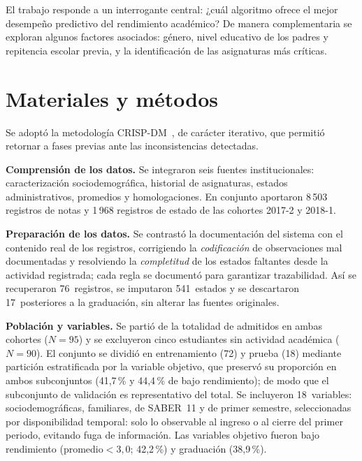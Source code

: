 \documentclass[runningheads]{llncs}
\begin{document}
El trabajo responde a un interrogante central: ¿cuál algoritmo ofrece
el mejor desempeño predictivo del rendimiento académico? De manera
complementaria se exploran algunos factores asociados: género, nivel
educativo de los padres y repitencia escolar previa, y la
identificación de las asignaturas más críticas.
 
\section{Materiales y métodos}
 
Se adoptó la metodología CRISP-DM~\cite{wirth2000}, de carácter
iterativo, que permitió retornar a fases previas ante las
inconsistencias detectadas.
 
\textbf{Comprensión de los datos.} Se integraron seis fuentes
institucionales: caracterización sociodemográfica, historial de
asignaturas, estados administrativos, promedios y homologaciones. En
conjunto aportaron 8\,503 registros de notas y 1\,968 registros de
estado de las cohortes 2017-2 y 2018-1.
 
\textbf{Preparación de los datos.} Se contrastó la documentación del
sistema con el contenido real de los registros, corrigiendo la
\emph{codificación} de observaciones mal documentadas y resolviendo la
\emph{completitud} de los estados faltantes desde la actividad
registrada; cada regla se documentó para garantizar trazabilidad. Así
se recuperaron 76~registros, se imputaron 541~estados y se descartaron
17~posteriores a la graduación, sin alterar las fuentes originales.
 
\textbf{Población y variables.} Se partió de la totalidad de admitidos en
ambas cohortes ($N=95$) y se excluyeron cinco estudiantes sin actividad
académica ($N=90$). El conjunto se dividió en entrenamiento (72) y
prueba (18) mediante partición estratificada por la variable objetivo,
que preservó su proporción en ambos subconjuntos (41,7\,\% y 44,4\,\%
de bajo rendimiento); de modo que el subconjunto de validación es
representativo del total. Se incluyeron 18~variables:
sociodemográficas, familiares, de SABER~11 y de primer semestre,
seleccionadas por disponibilidad temporal: solo lo observable al ingreso
o al cierre del primer periodo, evitando fuga de información. Las
variables objetivo fueron bajo rendimiento (promedio${}<3{,}0$;
42,2\,\%) y graduación (38,9\,\%).
 
\end{document}
